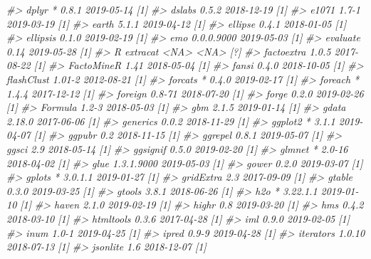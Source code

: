 \documentclass[]{krantz}
\makeatletter
\newenvironment{Shaded}{\begin{snugshade}}{\end{snugshade}}
\newcommand{\CommentTok}[1]{\textcolor[rgb]{0.37,0.37,0.37}{\textit{#1}}}
\newenvironment{kframe}{%
\medskip{}
\setlength{\fboxsep}{.8em}
 \def\at@end@of@kframe{}%
 \ifinner\ifhmode%
  \def\at@end@of@kframe{\end{minipage}}%
  \begin{minipage}{\columnwidth}%
 \fi\fi%
 \def\FrameCommand##1{\hskip\@totalleftmargin \hskip-\fboxsep
 \colorbox{shadecolor}{##1}\hskip-\fboxsep
     \hskip-\linewidth \hskip-\@totalleftmargin \hskip\columnwidth}%
 \MakeFramed {\advance\hsize-\width
   \@totalleftmargin\z@ \linewidth\hsize
   \@setminipage}}%
 {\par\unskip\endMakeFramed%
 \at@end@of@kframe}
\renewenvironment{Shaded}{\begin{kframe}}{\end{kframe}}
\makeatother
\begin{document}
\begin{Shaded}
\begin{Highlighting}[]
\CommentTok{#>    dplyr         * 0.8.1      2019-05-14 [1]}
\CommentTok{#>    dslabs          0.5.2      2018-12-19 [1]}
\CommentTok{#>    e1071           1.7-1      2019-03-19 [1]}
\CommentTok{#>    earth           5.1.1      2019-04-12 [1]}
\CommentTok{#>    ellipse         0.4.1      2018-01-05 [1]}
\CommentTok{#>    ellipsis        0.1.0      2019-02-19 [1]}
\CommentTok{#>    emo             0.0.0.9000 2019-05-03 [1]}
\CommentTok{#>    evaluate        0.14       2019-05-28 [1]}
\CommentTok{#>  R extracat        <NA>       <NA>       [?]}
\CommentTok{#>    factoextra      1.0.5      2017-08-22 [1]}
\CommentTok{#>    FactoMineR      1.41       2018-05-04 [1]}
\CommentTok{#>    fansi           0.4.0      2018-10-05 [1]}
\CommentTok{#>    flashClust      1.01-2     2012-08-21 [1]}
\CommentTok{#>    forcats       * 0.4.0      2019-02-17 [1]}
\CommentTok{#>    foreach       * 1.4.4      2017-12-12 [1]}
\CommentTok{#>    foreign         0.8-71     2018-07-20 [1]}
\CommentTok{#>    forge           0.2.0      2019-02-26 [1]}
\CommentTok{#>    Formula         1.2-3      2018-05-03 [1]}
\CommentTok{#>    gbm             2.1.5      2019-01-14 [1]}
\CommentTok{#>    gdata           2.18.0     2017-06-06 [1]}
\CommentTok{#>    generics        0.0.2      2018-11-29 [1]}
\CommentTok{#>    ggplot2       * 3.1.1      2019-04-07 [1]}
\CommentTok{#>    ggpubr          0.2        2018-11-15 [1]}
\CommentTok{#>    ggrepel         0.8.1      2019-05-07 [1]}
\CommentTok{#>    ggsci           2.9        2018-05-14 [1]}
\CommentTok{#>    ggsignif        0.5.0      2019-02-20 [1]}
\CommentTok{#>    glmnet        * 2.0-16     2018-04-02 [1]}
\CommentTok{#>    glue            1.3.1.9000 2019-05-03 [1]}
\CommentTok{#>    gower           0.2.0      2019-03-07 [1]}
\CommentTok{#>    gplots        * 3.0.1.1    2019-01-27 [1]}
\CommentTok{#>    gridExtra       2.3        2017-09-09 [1]}
\CommentTok{#>    gtable          0.3.0      2019-03-25 [1]}
\CommentTok{#>    gtools          3.8.1      2018-06-26 [1]}
\CommentTok{#>    h2o           * 3.22.1.1   2019-01-10 [1]}
\CommentTok{#>    haven           2.1.0      2019-02-19 [1]}
\CommentTok{#>    highr           0.8        2019-03-20 [1]}
\CommentTok{#>    hms             0.4.2      2018-03-10 [1]}
\CommentTok{#>    htmltools       0.3.6      2017-04-28 [1]}
\CommentTok{#>    iml             0.9.0      2019-02-05 [1]}
\CommentTok{#>    inum            1.0-1      2019-04-25 [1]}
\CommentTok{#>    ipred           0.9-9      2019-04-28 [1]}
\CommentTok{#>    iterators       1.0.10     2018-07-13 [1]}
\CommentTok{#>    jsonlite        1.6        2018-12-07 [1]}

\end{Highlighting}
\end{Shaded}
\end{document}
